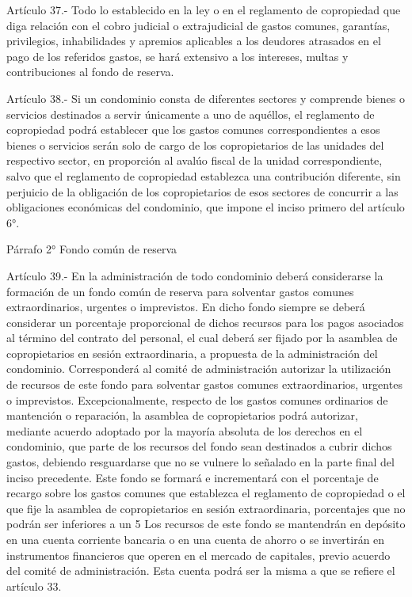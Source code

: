     Artículo 37.- Todo lo establecido en la ley o en el reglamento de copropiedad que diga relación con el cobro judicial o extrajudicial de gastos comunes, garantías, privilegios, inhabilidades y apremios aplicables a los deudores atrasados en el pago de los referidos gastos, se hará extensivo a los intereses, multas y contribuciones al fondo de reserva.
     
    Artículo 38.- Si un condominio consta de diferentes sectores y comprende bienes o servicios destinados a servir únicamente a uno de aquéllos, el reglamento de copropiedad podrá establecer que los gastos comunes correspondientes a esos bienes o servicios serán solo de cargo de los copropietarios de las unidades del respectivo sector, en proporción al avalúo fiscal de la unidad correspondiente, salvo que el reglamento de copropiedad establezca una contribución diferente, sin perjuicio de la obligación de los copropietarios de esos sectores de concurrir a las obligaciones económicas del condominio, que impone el inciso primero del artículo 6°.
     
    Párrafo 2°
    Fondo común de reserva

     
    Artículo 39.- En la administración de todo condominio deberá considerarse la formación de un fondo común de reserva para solventar gastos comunes extraordinarios, urgentes o imprevistos. En dicho fondo siempre se deberá considerar un porcentaje proporcional de dichos recursos para los pagos asociados al término del contrato del personal, el cual deberá ser fijado por la asamblea de copropietarios en sesión extraordinaria, a propuesta de la administración del condominio.
    Corresponderá al comité de administración autorizar la utilización de recursos de este fondo para solventar gastos comunes extraordinarios, urgentes o imprevistos. Excepcionalmente, respecto de los gastos comunes ordinarios de mantención o reparación, la asamblea de copropietarios podrá autorizar, mediante acuerdo adoptado por la mayoría absoluta de los derechos en el condominio, que parte de los recursos del fondo sean destinados a cubrir dichos gastos, debiendo resguardarse que no se vulnere lo señalado en la parte final del inciso precedente.
    Este fondo se formará e incrementará con el porcentaje de recargo sobre los gastos comunes que establezca el reglamento de copropiedad o el que fije la asamblea de copropietarios en sesión extraordinaria, porcentajes que no podrán ser inferiores a un 5%
    Los recursos de este fondo se mantendrán en depósito en una cuenta corriente bancaria o en una cuenta de ahorro o se invertirán en instrumentos financieros que operen en el mercado de capitales, previo acuerdo del comité de administración. Esta cuenta podrá ser la misma a que se refiere el artículo 33.

